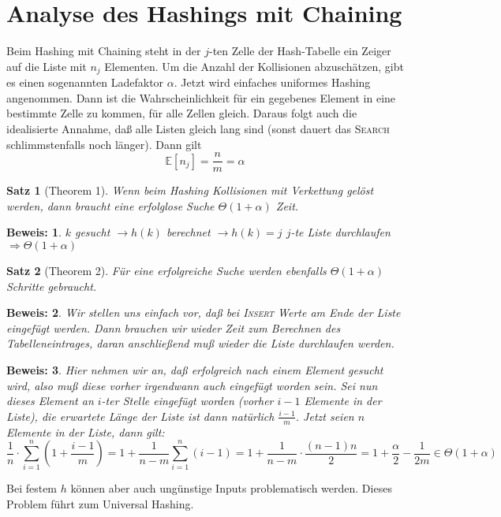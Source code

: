 \documentclass[ngerman,draft,parskip=half*,twoside]{scrreprt}
\theoremstyle{break}
\newtheorem{satz}{Satz}[chapter]
\theoremstyle{nonumberbreak}
\newtheorem{beweis}{Beweis:}
\begin{document}
\section{Analyse des Hashings mit Chaining}
Beim Hashing mit Chaining steht in der $j$-ten Zelle der Hash-Tabelle ein Zeiger auf die Liste mit $n_j$ Elementen. Um
die Anzahl der Kollisionen abzuschätzen, gibt es einen sogenannten Ladefaktor $\alpha$.
Jetzt wird einfaches uniformes Hashing angenommen. Dann ist die Wahrscheinlichkeit für ein gegebenes Element in eine bestimmte
Zelle zu kommen, für alle Zellen gleich. Daraus folgt auch die idealisierte Annahme, daß alle Listen gleich lang sind
(sonst dauert das \textsc{Search} schlimmstenfalls noch länger). Dann gilt \[\mathbb{E}[n_j]=\frac{n}{m}=\alpha\]

\begin{satz}[Theorem 1]
Wenn beim Hashing Kollisionen mit Verkettung gelöst werden, dann braucht eine erfolglose Suche $\Theta(1+\alpha)$
Zeit.
\end{satz}
\begin{beweis}
$k$ gesucht $\rightarrow h(k)$ berechnet $\rightarrow h(k)=j$ $j$-te Liste durchlaufen $\Rightarrow \Theta(1+\alpha)$
\end{beweis}

\begin{satz}[Theorem 2]
Für eine erfolgreiche Suche werden ebenfalls $\Theta(1+\alpha)$ Schritte gebraucht.
\end{satz}
\begin{beweis}
Wir stellen uns einfach vor, daß bei \textsc{Insert} Werte am Ende der Liste eingefügt werden. Dann brauchen wir
wieder Zeit zum Berechnen des Tabelleneintrages, daran anschließend muß wieder die Liste durchlaufen werden.
\end{beweis} 
\begin{beweis}
Hier nehmen wir an, daß erfolgreich nach einem Element gesucht wird, also muß diese vorher irgendwann auch eingefügt
worden sein. Sei nun dieses Element an $i$-ter Stelle eingefügt worden (vorher $i-1$ Elemente in der Liste), die
erwartete Länge der Liste ist dann natürlich $\frac{i-1}{m}$. Jetzt seien $n$ Elemente in der Liste, dann gilt:
\[\frac{1}{n} \cdot \sum_{i=1}^n (1+\frac{i-1}{m})=1+\frac{1}{n-m} \sum_{i=1}^n (i-1)=1+\frac{1}{n-m} \cdot
\frac{(n-1)n}{2}=1+\frac{\alpha}{2}-\frac{1}{2m} \in \Theta(1+\alpha)\]
\end{beweis}
Bei festem $h$ können aber auch ungünstige Inputs problematisch werden. Dieses Problem führt zum Universal Hashing.
\end{document}
